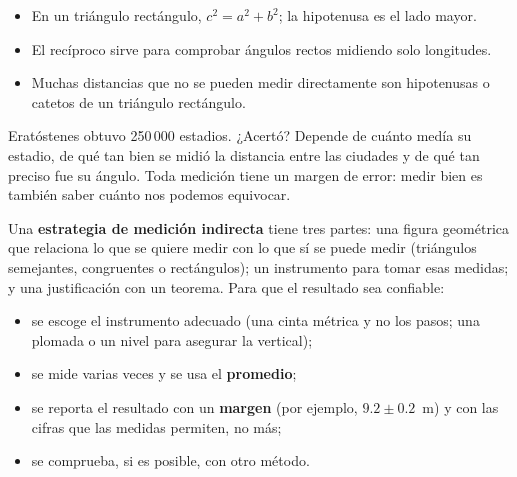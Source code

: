\documentclass[11pt]{article}
\begin{document}
\begin{resumen}
\begin{itemize}
  \item En un triángulo rectángulo, $c^2 = a^2 + b^2$; la hipotenusa es el lado mayor.
  \item El recíproco sirve para comprobar ángulos rectos midiendo solo longitudes.
  \item Muchas distancias que no se pueden medir directamente son hipotenusas o catetos de un triángulo rectángulo.
\end{itemize}
\end{resumen}

\label{tema:medicion}

\begin{hilo}
Eratóstenes obtuvo 250\,000 estadios. ¿Acertó? Depende de cuánto medía su estadio,
de qué tan bien se midió la distancia entre las ciudades y de qué tan preciso fue su
ángulo. Toda medición tiene un margen de error: medir bien es también saber cuánto
nos podemos equivocar.
\end{hilo}

Una \textbf{estrategia de medición indirecta} tiene tres partes: una figura
geométrica que relaciona lo que se quiere medir con lo que sí se puede medir
(triángulos semejantes, congruentes o rectángulos); un instrumento para tomar esas
medidas; y una justificación con un teorema. Para que el resultado sea confiable:
\begin{itemize}
  \item se escoge el instrumento adecuado (una cinta métrica y no los pasos; una
        plomada o un nivel para asegurar la vertical);
  \item se mide varias veces y se usa el \textbf{promedio};
  \item se reporta el resultado con un \textbf{margen} (por ejemplo, $\num{9,2} \pm
        \num{0,2}$~m) y con las cifras que las medidas permiten, no más;
  \item se comprueba, si es posible, con otro método.
\end{itemize}
\end{document}
